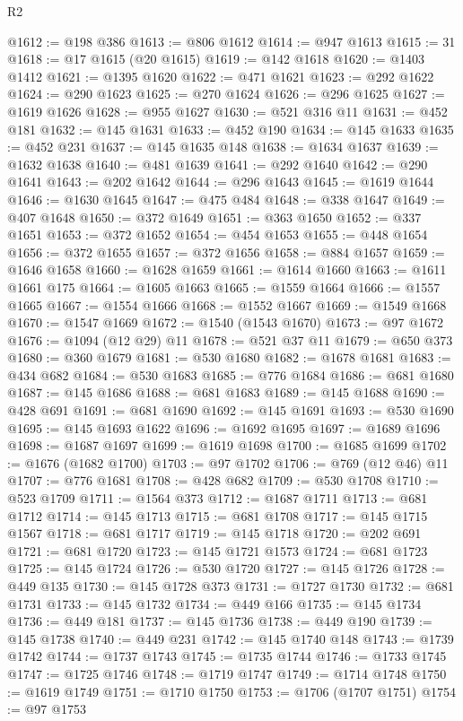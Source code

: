 \begin{lexlean}{R2}
\begin{coremodule}
@1612 := @198 @386
@1613 := @806 @1612
@1614 := @947 @1613
@1615 := 31
@1618 := @17 @1615 (@20 @1615)
@1619 := @142 @1618
@1620 := @1403 @1412
@1621 := @1395 @1620
@1622 := @471 @1621
@1623 := @292 @1622
@1624 := @290 @1623
@1625 := @270 @1624
@1626 := @296 @1625
@1627 := @1619 @1626
@1628 := @955 @1627
@1630 := @521 @316 @11
@1631 := @452 @181
@1632 := @145 @1631
@1633 := @452 @190
@1634 := @145 @1633
@1635 := @452 @231
@1637 := @145 @1635 @148
@1638 := @1634 @1637
@1639 := @1632 @1638
@1640 := @481 @1639
@1641 := @292 @1640
@1642 := @290 @1641
@1643 := @202 @1642
@1644 := @296 @1643
@1645 := @1619 @1644
@1646 := @1630 @1645
@1647 := @475 @484
@1648 := @338 @1647
@1649 := @407 @1648
@1650 := @372 @1649
@1651 := @363 @1650
@1652 := @337 @1651
@1653 := @372 @1652
@1654 := @454 @1653
@1655 := @448 @1654
@1656 := @372 @1655
@1657 := @372 @1656
@1658 := @884 @1657
@1659 := @1646 @1658
@1660 := @1628 @1659
@1661 := @1614 @1660
@1663 := @1611 @1661 @175
@1664 := @1605 @1663
@1665 := @1559 @1664
@1666 := @1557 @1665
@1667 := @1554 @1666
@1668 := @1552 @1667
@1669 := @1549 @1668
@1670 := @1547 @1669
@1672 := @1540 (@1543 @1670)
@1673 := @97 @1672
@1676 := @1094 (@12 @29) @11
@1678 := @521 @37 @11
@1679 := @650 @373
@1680 := @360 @1679
@1681 := @530 @1680
@1682 := @1678 @1681
@1683 := @434 @682
@1684 := @530 @1683
@1685 := @776 @1684
@1686 := @681 @1680
@1687 := @145 @1686
@1688 := @681 @1683
@1689 := @145 @1688
@1690 := @428 @691
@1691 := @681 @1690
@1692 := @145 @1691
@1693 := @530 @1690
@1695 := @145 @1693 @1622
@1696 := @1692 @1695
@1697 := @1689 @1696
@1698 := @1687 @1697
@1699 := @1619 @1698
@1700 := @1685 @1699
@1702 := @1676 (@1682 @1700)
@1703 := @97 @1702
@1706 := @769 (@12 @46) @11
@1707 := @776 @1681
@1708 := @428 @682
@1709 := @530 @1708
@1710 := @523 @1709
@1711 := @1564 @373
@1712 := @1687 @1711
@1713 := @681 @1712
@1714 := @145 @1713
@1715 := @681 @1708
@1717 := @145 @1715 @1567
@1718 := @681 @1717
@1719 := @145 @1718
@1720 := @202 @691
@1721 := @681 @1720
@1723 := @145 @1721 @1573
@1724 := @681 @1723
@1725 := @145 @1724
@1726 := @530 @1720
@1727 := @145 @1726
@1728 := @449 @135
@1730 := @145 @1728 @373
@1731 := @1727 @1730
@1732 := @681 @1731
@1733 := @145 @1732
@1734 := @449 @166
@1735 := @145 @1734
@1736 := @449 @181
@1737 := @145 @1736
@1738 := @449 @190
@1739 := @145 @1738
@1740 := @449 @231
@1742 := @145 @1740 @148
@1743 := @1739 @1742
@1744 := @1737 @1743
@1745 := @1735 @1744
@1746 := @1733 @1745
@1747 := @1725 @1746
@1748 := @1719 @1747
@1749 := @1714 @1748
@1750 := @1619 @1749
@1751 := @1710 @1750
@1753 := @1706 (@1707 @1751)
@1754 := @97 @1753

\end{coremodule}
\end{lexlean}

